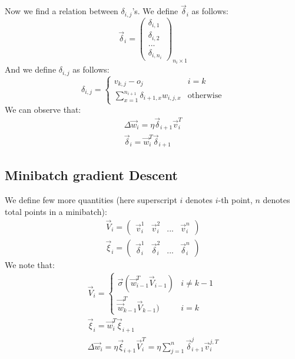 \documentclass{article}
\begin{document}
Now we find a relation between $\delta_{i,j}$'s. We define $\vec \delta_i$ as follows:
$$\vec \delta_i=\begin{pmatrix}\delta_{i,1}\\\delta_{i,2}\\...\\\delta_{i,n_i}\end{pmatrix}_{n_i\times 1}$$
And we define $\delta_{i,j}$ as follows:
$$\delta_{i,j}=\begin{cases}v_{k,j}-o_j&i=k\\\displaystyle\sum_{x=1}^{n_{i+1}}\delta_{i+1,x}w_{i,j,x}&\text{otherwise}\end{cases}$$
We can observe that:
\begin{gather*}\Delta\vec w_{i}=\eta \vec \delta_{i+1}\vec v_{i}^T\\
\vec\delta_i=\vec w_i^T\vec \delta_{i+1}
\end{gather*}
\subsection{Minibatch gradient Descent}
We define few more quantities (here superscript $i$ denotes $i$-th point, $n$ denotes total points in a minibatch):
\begin{gather*}
\vec V_i = \begin{pmatrix}\vec v_i^1&\vec v_i^2&...&\vec v_i^n\end{pmatrix}\\
\vec \xi_i =\begin{pmatrix}\vec \delta_i^1&\vec \delta_i^2&...&\vec \delta_i^n\end{pmatrix}
\end{gather*}
We note that:
\begin{gather*}
\vec V_i = \begin{cases}\vec \sigma (\vec w_{i-1}^T \vec V_{i-1})&i\ne k-1\\\vec \vec w_{k-1}^T \vec V_{k-1})&i=k\end{cases}\\
\vec \xi_i = \vec w_i^T\vec \xi_{i+1}\\
\Delta \vec w_i = \eta\vec \xi_{i+1} \vec V_{i}^T=\eta \sum_{j=1}^n\vec \delta_{i+1}^j\vec v_i^{j,T}
\end{gather*}
\end{document}
